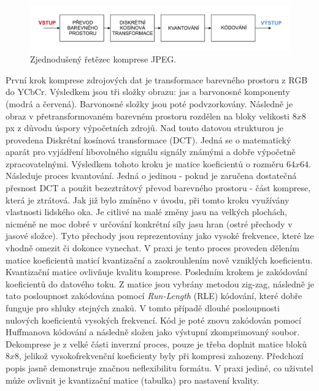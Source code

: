 \begin{figure}[hbt!]
  \hspace*{-0.5cm}
  \includegraphics[width=16cm]{obrazky-figures/Artboard.pdf}
  \caption{Zjednodušený řetězec komprese JPEG.}
  \label{retezec}
\end{figure}
 První krok komprese zdrojových dat je transformace barevného prostoru z RGB do YCbCr. Výsledkem jsou tři složky obrazu: jas a barvonosné komponenty (modrá a červená). Barvonosné složky jsou poté podvzorkovány. Následně je obraz v přetransformovaném barevném prostoru rozdělen na bloky velikosti $8x8$ px z důvodu úspory výpočetních zdrojů. Nad touto datovou strukturou je provedena Diskrétní kosínová transformace (DCT). Jedná se o matematický aparát pro vyjádření libovolného signálu signály známými a dobře výpočetně zpracovatelnými. Výsledkem tohoto kroku je matice koeficientů o rozměru $64x64$. Následuje proces kvantování. Jedná o jedinou - pokud je zaručena dostatečná přesnost DCT a použit bezeztrátový převod barevného prostoru - část komprese, která je ztrátová. Jak již bylo zmíněno v úvodu, při tomto kroku využívány vlastnosti lidského oka. Je citlivé na malé změny jasu na velkých plochách, nicméně ne moc dobré v určování konkrétní síly jasu hran (ostré přechody v jasové složce). Tyto přechody jsou reprezentovány jako vysoké frekvence, které lze vhodně omezit či dokonce vynechat. V praxi je tento proces proveden dělením matice koeficientů maticí kvantizační a zaokrouhlením nově vzniklých koeficientu. Kvantizační matice ovlivňuje kvalitu komprese. Posledním krokem je zakódování koeficientů do datového toku. Z matice jsou vybrány metodou zig-zag, následně je tato posloupnost zakódována pomocí \textit{Run-Length} (RLE) kódování, které dobře funguje pro shluky stejných znaků. V tomto případě dlouhé posloupnosti nulových koeficientů vysokých frekvencí. Kód je poté znovu zakódován pomocí Huffmanova kódování a následně složen jako výstupní zkomprimovaný soubor.
Dekomprese je z velké části inverzní proces, pouze je třeba doplnit matice bloků $8x8$, jelikož vysokofrekvenční koeficienty byly při kompresi zahozeny. Předchozí popis jasně demonstruje značnou neflexibilitu formátu. V praxi jediné, co uživatel může ovlivnit je kvantizační matice (tabulka) pro nastavení kvality. 

